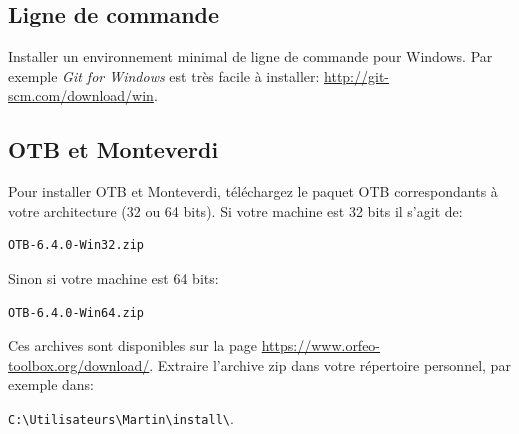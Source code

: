 \documentclass[10pt,a4paper]{article}
\begin{document}
\subsection{Ligne de commande}
Installer un environnement minimal de ligne de commande pour Windows. Par
exemple
\textit{Git for Windows} est très facile à installer:
\url{http://git-scm.com/download/win}.

\subsection{OTB et Monteverdi}
Pour installer OTB et Monteverdi, téléchargez le paquet OTB correspondants à
votre architecture (32 ou 64 bits). Si votre machine est 32
bits il s'agit de:

\begin{verbatim}
OTB-6.4.0-Win32.zip
\end{verbatim}

Sinon si votre machine est 64 bits:

\begin{verbatim}
OTB-6.4.0-Win64.zip
\end{verbatim}

Ces archives sont disponibles sur la page
\url{https://www.orfeo-toolbox.org/download/}.
Extraire l'archive zip dans votre répertoire personnel, par exemple dans:\\
\begin{centering}
\texttt{C:{\textbackslash}Utilisateurs{\textbackslash}Martin{\textbackslash}install{\textbackslash}}.
\end{centering}
\end{document}
